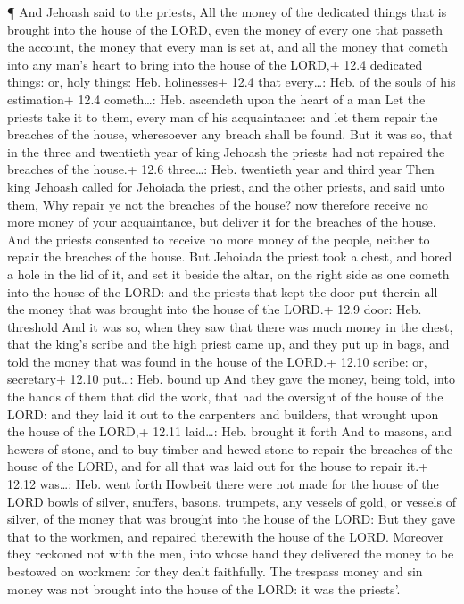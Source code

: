  ¶ And Jehoash said to the priests, All the money of the
dedicated things that is brought into the house of the LORD, even the
money of every one that passeth the account, the money that every man is
set at, and all the money that cometh into any man's heart to bring into
the house of the LORD,+ 12.4 dedicated things: or, holy things: Heb.
holinesses+ 12.4 that every\ldots: Heb. of the souls of his estimation+
12.4 cometh\ldots: Heb. ascendeth upon the heart of a man 
Let the priests take it to them, every man of his acquaintance: and let
them repair the breaches of the house, wheresoever any breach shall be
found.  But it was so, that in the three and twentieth year
of king Jehoash the priests had not repaired the breaches of the house.+
12.6 three\ldots: Heb. twentieth year and third year  Then
king Jehoash called for Jehoiada the priest, and the other priests, and
said unto them, Why repair ye not the breaches of the house? now
therefore receive no more money of your acquaintance, but deliver it for
the breaches of the house.  And the priests consented to
receive no more money of the people, neither to repair the breaches of
the house.  But Jehoiada the priest took a chest, and bored
a hole in the lid of it, and set it beside the altar, on the right side
as one cometh into the house of the LORD: and the priests that kept the
door put therein all the money that was brought into the house of the
LORD.+ 12.9 door: Heb. threshold  And it was so, when they
saw that there was much money in the chest, that the king's scribe and
the high priest came up, and they put up in bags, and told the money
that was found in the house of the LORD.+ 12.10 scribe: or, secretary+
12.10 put\ldots: Heb. bound up  And they gave the money,
being told, into the hands of them that did the work, that had the
oversight of the house of the LORD: and they laid it out to the
carpenters and builders, that wrought upon the house of the LORD,+ 12.11
laid\ldots: Heb. brought it forth  And to masons, and
hewers of stone, and to buy timber and hewed stone to repair the
breaches of the house of the LORD, and for all that was laid out for the
house to repair it.+ 12.12 was\ldots: Heb. went forth 
Howbeit there were not made for the house of the LORD bowls of silver,
snuffers, basons, trumpets, any vessels of gold, or vessels of silver,
of the money that was brought into the house of the LORD: 
But they gave that to the workmen, and repaired therewith the house of
the LORD.  Moreover they reckoned not with the men, into
whose hand they delivered the money to be bestowed on workmen: for they
dealt faithfully.  The trespass money and sin money was not
brought into the house of the LORD: it was the priests'.

